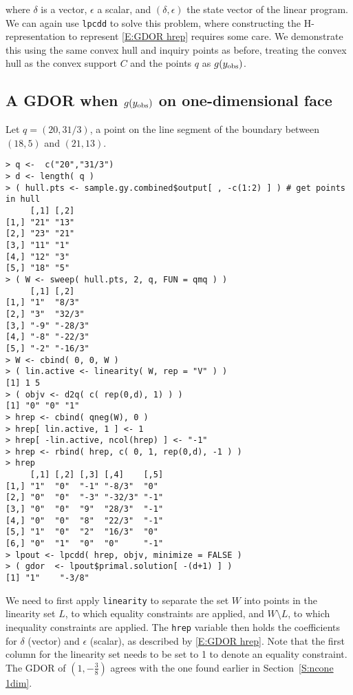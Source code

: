 where $\delta$ is a vector, $\epsilon$ a scalar, and $(\delta, \epsilon)$ the state
vector of the linear program.  We can again use \texttt{lpcdd} to solve this 
problem, where constructing the H-representation to represent \eqref{E:GDOR hrep}
requires some care.  We demonstrate this using the same convex hull and inquiry points as 
before, treating the convex hull as the convex support $C$ and 
the points $q$ as $g(y_{\text{obs}})$.
\subsection{A GDOR when $g(y_{\text{obs}})$ on one-dimensional face} \label{S:GDOR 1dim}
Let $q = (20, 31/3)$, a point on the line segment of the boundary
between $(18,5)$ and $(21,13)$.
\begin{verbatim}
> q <-  c("20","31/3")
> d <- length( q )
> ( hull.pts <- sample.gy.combined$output[ , -c(1:2) ] ) # get points in hull
     [,1] [,2]
[1,] "21" "13"
[2,] "23" "21"
[3,] "11" "1" 
[4,] "12" "3" 
[5,] "18" "5" 
> ( W <- sweep( hull.pts, 2, q, FUN = qmq ) )
     [,1] [,2]   
[1,] "1"  "8/3"  
[2,] "3"  "32/3" 
[3,] "-9" "-28/3"
[4,] "-8" "-22/3"
[5,] "-2" "-16/3"
> W <- cbind( 0, 0, W )
> ( lin.active <- linearity( W, rep = "V" ) )
[1] 1 5
> ( objv <- d2q( c( rep(0,d), 1) ) )
[1] "0" "0" "1"
> hrep <- cbind( qneg(W), 0 ) 
> hrep[ lin.active, 1 ] <- 1
> hrep[ -lin.active, ncol(hrep) ] <- "-1"
> hrep <- rbind( hrep, c( 0, 1, rep(0,d), -1 ) )
> hrep
     [,1] [,2] [,3] [,4]    [,5]
[1,] "1"  "0"  "-1" "-8/3"  "0" 
[2,] "0"  "0"  "-3" "-32/3" "-1"
[3,] "0"  "0"  "9"  "28/3"  "-1"
[4,] "0"  "0"  "8"  "22/3"  "-1"
[5,] "1"  "0"  "2"  "16/3"  "0" 
[6,] "0"  "1"  "0"  "0"     "-1"
> lpout <- lpcdd( hrep, objv, minimize = FALSE )
> ( gdor  <- lpout$primal.solution[ -(d+1) ] )
[1] "1"    "-3/8"
\end{verbatim}
We need to first apply \texttt{linearity} to separate the set $W$ into points in the 
linearity set $L$, to which equality constraints are applied, and 
$W \setminus L$, to which inequality constraints are applied.  
The \texttt{hrep} variable then holds the coefficients for $\delta$ (vector) and
$\epsilon$ (scalar), as described by \eqref{E:GDOR hrep}.  Note that the first column
for the linearity set needs to be set to 1 to denote an equality constraint.
The GDOR of $(1, -\frac{3}{8} )$ agrees with the one found earlier
in Section~\ref{S:ncone 1dim}.

